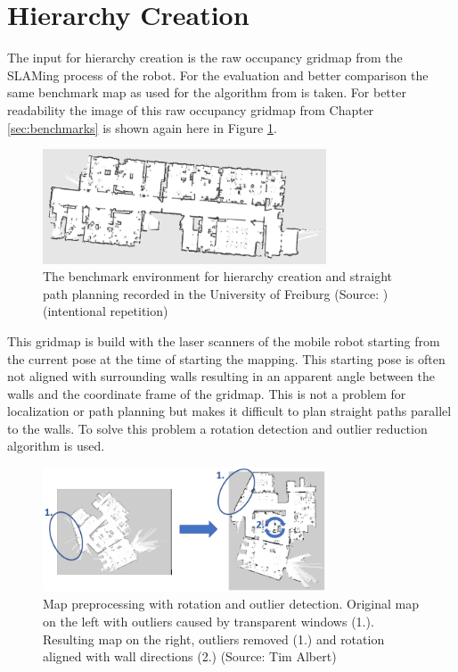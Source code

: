 \section{Hierarchy Creation}
\label{sec:hierarchy_creation}
The input for hierarchy creation is the raw occupancy gridmap from the SLAMing process of the robot. For the evaluation and better comparison the same benchmark map as used for the algorithm from \cite{ryu_hierarchical_2020} is taken. For better readability the image of this raw occupancy gridmap from Chapter \ref{sec:benchmarks} is shown again here in Figure \ref{fig:freiburg_benchmark_2}.

\begin{figure}[h]
    \centering
    \includegraphics[width=0.75\textwidth]{figures/30_methods/freiburg_benchmark.png}
    \caption[The benchmark environment for hierarchy creation and straight path planning (intentional repetition)]{The benchmark environment for hierarchy creation and straight path planning recorded in the University of Freiburg (Source: \cite{cyrill_stachniss_robotics_2015})(intentional repetition)}
    \label{fig:freiburg_benchmark_2}
\end{figure}

This gridmap is build with the laser scanners of the mobile robot starting from the current pose at the time of starting the mapping. This starting pose is often not aligned with surrounding walls resulting in an apparent angle between the walls and the coordinate frame of the gridmap. This is not a problem for localization or path planning but makes it difficult to plan straight paths parallel to the walls. To solve this problem a rotation detection and outlier reduction algorithm is used.

\begin{figure}[h]
    \centering
    \includegraphics[width=0.75\textwidth]{figures/50_implementation/model_preprocessing_goal.png}
    \caption[Map preprocessing with rotation and outlier detection]{Map preprocessing with rotation and outlier detection. Original map on the left with outliers caused by transparent windows (1.). Resulting map on the right, outliers removed (1.) and rotation aligned with wall directions (2.) (Source: Tim Albert)}
    \label{fig:map_preprocessing}
\end{figure}


